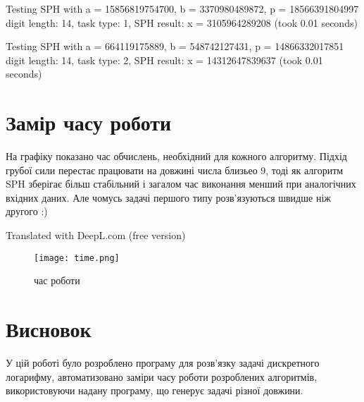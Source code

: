 \documentclass{article}
\begin{document}
Testing SPH with a = 15856819754700, b = 3370980489872, p = 18566391804997
digit length: 14, task type: 1, SPH result: x = 3105964289208 (took 0.01 seconds)

Testing SPH with a = 664119175889, b = 548742127431, p = 14866332017851
digit length: 14, task type: 2, SPH result: x = 14312647839637 (took 0.01 seconds)

\section{Замір часу роботи}
\quad На графіку показано час обчислень, необхідний для кожного алгоритму. Підхід грубої сили перестає працювати на довжині числа близьео 9, тоді як алгоритм SPH зберігає більш стабільний і загалом час виконання менший при аналогічних вхідних даних. Але чомусь задачі першого типу розв'язуються швидше ніж другого :)

Translated with DeepL.com (free version)
\begin{figure}[htbp]
    \centering
    \texttt{[image: time.png]}
    \caption{час роботи}
    \label{fig:screenshot}
\end{figure}

\section{Висновок}
\quad
У цій роботі було розроблено програму для розв'язку задачі дискретного логарифму, автоматизовано заміри часу роботи розроблених алгоритмів, використовуючи надану програму, що генерує задачі різної довжини.
\end{document}
